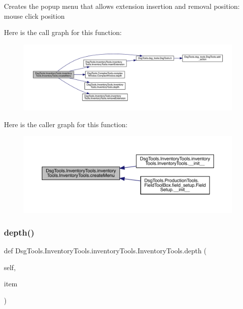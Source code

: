 \begin{DoxyVerb}Creates the popup menu that allows extension insertion and removal
position: mouse click position
\end{DoxyVerb}
 Here is the call graph for this function\+:
\nopagebreak
\begin{figure}[H]
\begin{center}
\leavevmode
\includegraphics[width=350pt]{class_dsg_tools_1_1_inventory_tools_1_1inventory_tools_1_1_inventory_tools_ad2eacea7f239cce9518b8096a51cd9ed_cgraph}
\end{center}
\end{figure}
Here is the caller graph for this function\+:
\nopagebreak
\begin{figure}[H]
\begin{center}
\leavevmode
\includegraphics[width=350pt]{class_dsg_tools_1_1_inventory_tools_1_1inventory_tools_1_1_inventory_tools_ad2eacea7f239cce9518b8096a51cd9ed_icgraph}
\end{center}
\end{figure}
\mbox{\label{class_dsg_tools_1_1_inventory_tools_1_1inventory_tools_1_1_inventory_tools_ae5e3d8c75b14858504e8acc404dbf89e}} 
\subsubsection{\texorpdfstring{depth()}{depth()}}
{\footnotesize\ttfamily def Dsg\+Tools.\+Inventory\+Tools.\+inventory\+Tools.\+Inventory\+Tools.\+depth (\begin{DoxyParamCaption}\item[{}]{self,  }\item[{}]{item }\end{DoxyParamCaption})}

